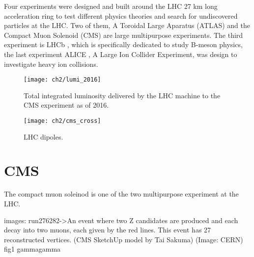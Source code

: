 
Four experiments were designed and built around the LHC 27 km long acceleration ring to test different physics theories and search for undiscovered particles at the LHC. Two of them, A Toroidal Large Aparatus (ATLAS)\cite{atlas} and the Compact Muon Solenoid (CMS)\cite{cms_doc} are large multipurpose experiments. The third experiment is LHCb \cite{lhcb}, which is specifically dedicated to study B-meson physics, the last experiment ALICE \cite{alice}, A Large Ion Collider Experiment, was design to investigate heavy ion collisions.


\begin{figure}[!h]
	\centering
	\texttt{[image: ch2/lumi\_2016]}
	\caption[LHC luminosity]{Total integrated luminosity delivered by the LHC machine to the CMS experiment as of 2016.{}}
	\label{lumi2016}
\end{figure}


\begin{figure}[!h]
	\centering
	\texttt{[image: ch2/cms\_cross]}
	\caption[LHC dipoles]{LHC dipoles.}
	\label{fig:cmscross}
\end{figure}


\section{CMS}
The compact muon soleinod is one of the two multipurpose experiment at the LHC.

images: 
run276282->An event where two Z candidates are produced and each decay into two muons, each given by the red lines. This event has 27 reconstructed vertices. (CMS SketchUp model by Tai Sakuma) (Image: CERN)
fig1 gammagamma 


